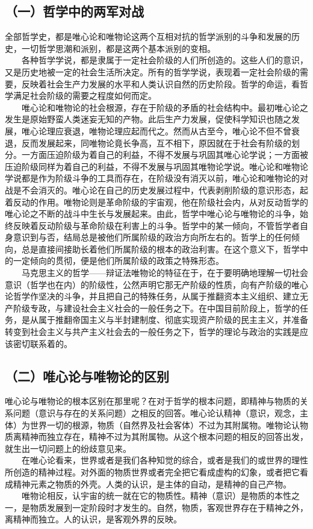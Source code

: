 \documentclass[cn,11pt,chinese]{elegantbook}
\def\myformat#1{\hfil\hfil #1}
\begin{document}
\subsection*{\myformat{（一）哲学中的两军对战}}
全部哲学史，都是唯心论和唯物论这两个互相对抗的哲学派别的斗争和发展的历史，一切哲学思潮和派别，都是这两个基本派别的变相。\\
　　各种哲学学说，都是隶属于一定社会阶级的人们所创造的。这些人们的意识，又是历史地被一定的社会生活所决定。所有的哲学学说，表现着一定社会阶级的需要，反映着社会生产力发展的水平和人类认识自然的历史阶段。哲学的命运，看哲学满足社会阶级的需要之程度如何而定。\\
　　唯心论和唯物论的社会根源，存在于阶级的矛盾的社会结构中。最初唯心论之发生是原始野蛮人类迷妄无知的产物。此后生产力发展，促使科学知识也随之发展，唯心论理应衰退，唯物论理应起而代之。然而从古至今，唯心论不但不曾衰退，反而发展起来，同唯物论竟长争高，互不相下，原因就在于社会有阶级的划分。一方面压迫阶级为着自己的利益，不得不发展与巩固其唯心论学说；一方面被压迫阶级同样为着自己的利益，不得不发展与巩固其唯物论学说。唯心论和唯物论学说都是作为阶级斗争的工具而存在，在阶级没有消灭以前，唯心论和唯物论的对战是不会消灭的。唯心论在自己的历史发展过程中，代表剥削阶级的意识形态，起着反动的作用。唯物论则是革命阶级的宇宙观，他在阶级社会内，从对反动哲学的唯心论之不断的战斗中生长与发展起来。由此，哲学中唯心论与唯物论的斗争，始终反映着反动阶级与革命阶级在利害上的斗争。哲学中的某一倾向，不管哲学者自身意识到与否，结局总是被他们所属阶级的政治方向所左右的。哲学上的任何倾向，总是直接间接助长着他们所属阶级的根本的政治利害。在这个意义下，哲学中的一定倾向的贯彻，便是他们所属阶级的政策之特殊形态。\\
　　马克思主义的哲学——辩证法唯物论的特征在于，在于要明确地理解一切社会意识（哲学也在内）的阶级性，公然声明它那无产阶级的性质，向有产阶级的唯心论哲学作坚决的斗争，并且把自己的特殊任务，从属于推翻资本主义组织、建立无产阶级专政，与建设社会主义社会的一般任务之下。在中国目前阶段上，哲学的任务，是从属于推翻帝国主义与半封建制度、彻底实现资产阶级的民主主义，并准备转变到社会主义与共产主义社会去的一般任务之下，哲学的理论与政治的实践是应该密切联系着的。\\
\subsection*{\myformat{（二）唯心论与唯物论的区别}}
唯心论与唯物论的根本区别在那里呢？在对于哲学的根本问题，即精神与物质的关系问题（意识与存在的关系问题）之相反的回答。唯心论认精神（意识，观念，主体）为世界一切的根源，物质（自然界及社会客体）不过为其附属物。唯物论认物质离精神而独立存在，精神不过为其附属物。从这个根本问题的相反的回答出发，就生出一切问题上的纷歧意见来。\\
　　在唯心论看来，世界或者是我们各种知觉的综合，或者是我们的或世界的理性所创造的精神过程。对外面的物质世界或者完全把它看成虚构的幻象，或者把它看成精神元素之物质的外壳。人类的认识，是主体的自动，是精神的自己产物。\\
　　唯物论相反，认宇宙的统一就在它的物质性。精神（意识）是物质的本性之一，是物质发展到一定阶段时才发生的。自然，物质，客观世界存在于精神之外，离精神而独立。人的认识，是客观外界的反映。\\
\end{document}
